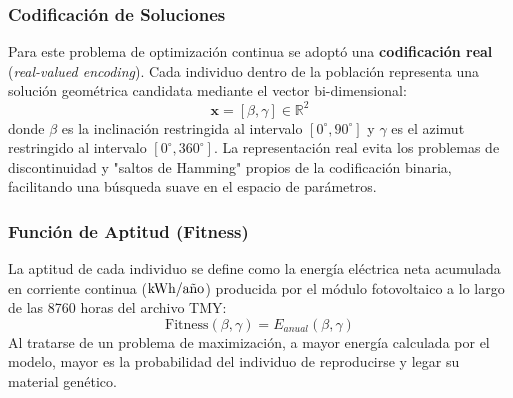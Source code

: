\documentclass[12pt, a4paper, twocolumn]{article}
\begin{document}
\subsubsection{Codificación de Soluciones}
Para este problema de optimización continua se adoptó una \textbf{codificación real} (\textit{real-valued encoding}). Cada individuo dentro de la población representa una solución geométrica candidata mediante el vector bi-dimensional:
\begin{equation}
\mathbf{x} = [\beta, \gamma] \in \mathbb{R}^2
\end{equation}
donde $\beta$ es la inclinación restringida al intervalo $[0^\circ, 90^\circ]$ y $\gamma$ es el azimut restringido al intervalo $[0^\circ, 360^\circ]$. La representación real evita los problemas de discontinuidad y "saltos de Hamming" propios de la codificación binaria, facilitando una búsqueda suave en el espacio de parámetros.

\subsubsection{Función de Aptitud (Fitness)}
La aptitud de cada individuo se define como la energía eléctrica neta acumulada en corriente continua ($\text{kWh/\text{año}}$) producida por el módulo fotovoltaico a lo largo de las 8760 horas del archivo TMY:
\begin{equation}
\text{Fitness}(\beta, \gamma) = E_{anual}(\beta, \gamma)
\end{equation}
Al tratarse de un problema de maximización, a mayor energía calculada por el modelo, mayor es la probabilidad del individuo de reproducirse y legar su material genético.
\end{document}
